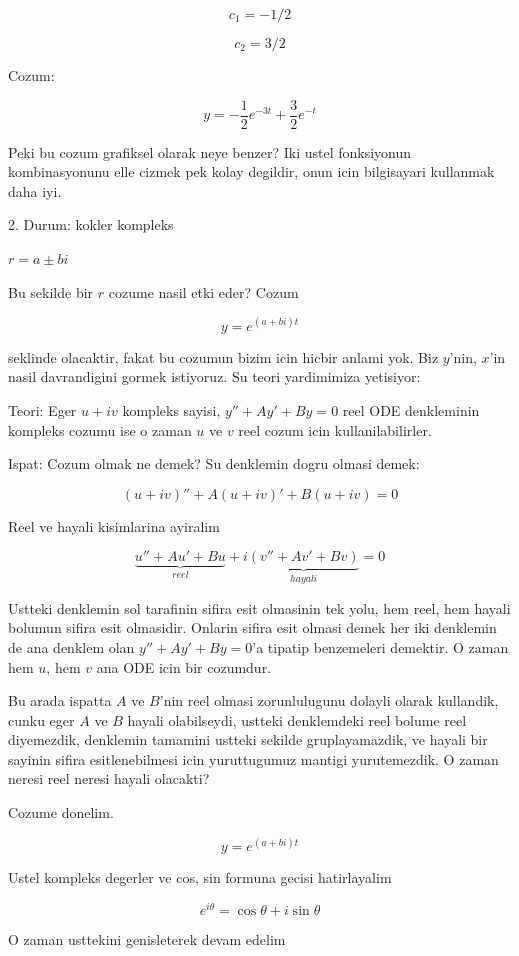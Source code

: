 \documentclass[12pt,fleqn]{article}\usepackage{../common}
\begin{document}
\[ c_1 = -1/2 \]

\[ c_2 = 3/2 \]

Cozum: 

\[ y = -\frac{1}{2}e^{-3t} + \frac{3}{2}e^{-t} \]

Peki bu cozum grafiksel olarak neye benzer? Iki ustel fonksiyonun
kombinasyonunu elle cizmek pek kolay degildir, onun icin bilgisayari
kullanmak daha iyi. 

2. Durum: kokler kompleks 

$r = a \pm bi$

Bu sekilde bir $r$ cozume nasil etki eder? Cozum

\[ y = e^{(a+bi)t} \] 

seklinde olacaktir, fakat bu cozumun bizim icin hicbir anlami yok. Biz
$y$'nin, $x$'in nasil davrandigini gormek istiyoruz. Su teori yardimimiza
yetisiyor: 

Teori: Eger $u + iv$ kompleks sayisi, $y'' + Ay' + By = 0$ reel ODE
denkleminin kompleks cozumu ise o zaman $u$ ve $v$ reel cozum icin
kullanilabilirler.

Ispat: Cozum olmak ne demek? Su denklemin dogru olmasi demek: 

\[ (u+iv)'' + A(u+iv)' + B(u+iv) = 0\]

Reel ve hayali kisimlarina ayiralim

\[ 
\underbrace{u'' + Au' + Bu}_{reel} + 
i\underbrace{(v'' + Av' + Bv)}_{hayali} = 0
\]

Ustteki denklemin sol tarafinin sifira esit olmasinin tek yolu, hem reel,
hem hayali bolumun sifira esit olmasidir. Onlarin sifira esit olmasi demek
her iki denklemin de ana denklem olan $y'' + Ay' + By = 0$'a tipatip
benzemeleri demektir. O zaman hem $u$, hem $v$ ana ODE icin bir cozumdur. 

Bu arada ispatta $A$ ve $B$'nin reel olmasi zorunlulugunu dolayli olarak
kullandik, cunku eger $A$ ve $B$ hayali olabilseydi, ustteki denklemdeki
reel bolume reel diyemezdik, denklemin tamamini ustteki sekilde
gruplayamazdik, ve hayali bir sayinin sifira esitlenebilmesi icin
yuruttugumuz mantigi yurutemezdik. O zaman neresi reel neresi hayali
olacakti? 

Cozume donelim. 

\[ y = e^{(a+bi)t} \] 

Ustel kompleks degerler ve cos, sin formuna gecisi hatirlayalim

\[ e^{i\theta} = \cos \theta + i\sin \theta \]

O zaman usttekini genisleterek devam edelim
\end{document}
